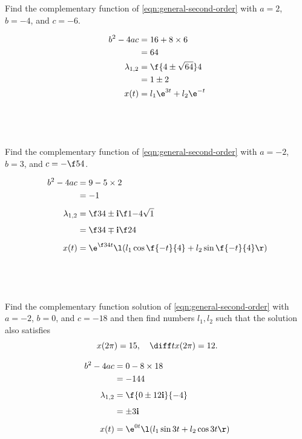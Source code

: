 \documentclass[a4paper]{article}
\begin{document}
\newpage
\subsection{~} %

\begin{questionbody}
Find the complementary function of \eqref{eqn:general-second-order} with $a = 2$, $b = -4$, and $c = -6$.
\end{questionbody}
%
\begin{align*}
b^2 - 4ac &= 16 + 8 \times 6 \\
&= 64 \\
\lambda_{1,2} &= \f{4 \pm \sqrt{64}}4 \\
&= 1 \pm 2 \\
x(t) &= l_1 \e^{3t} + l_2 \e^{-t}
\end{align*}

\subsection{~} %

\begin{questionbody}
Find the complementary function of \eqref{eqn:general-second-order} with $a = -2$, $b = 3$, and $c = -\f54$.
\end{questionbody}
%
\begin{align*}
b^2 - 4ac &= 9 - 5 \times 2 \\
&= -1 \\[1ex]
\lambda_{1,2} &= \f34 \pm \mathbf{i} \f1{-4} \sqrt{1} \\[1ex]
&= \f34 \mp \mathbf{i} \f24 \\[1ex]
x(t) &= \e^{\f34 t} \l( l_1 \cos \f{-t}{4} + l_2 \sin \f{-t}{4} \r)
\end{align*}

\subsection{~} %

\begin{questionbody}
Find the complementary function solution of \eqref{eqn:general-second-order} with $a = -2$, $b = 0$, and $c = -18$ and then find numbers $l_1, l_2$ such that the solution also satisfies \[
x(2\pi) = 15, \quad \diff t x(2\pi) = 12.
\]
\end{questionbody}
%
\begin{align*}
b^2 - 4ac &= 0 - 8 \times 18 \\
&= -144 \\[1ex]
\lambda_{1,2} &= \f{0 \pm 12 \mathbf{i}}{-4} \\[1ex]
&= \pm 3 \mathbf{i} \\[1ex]
x(t) &= \e^{0t} \l( l_1 \sin 3t + l_2 \cos 3t \r)
\end{align*}
\end{document}
